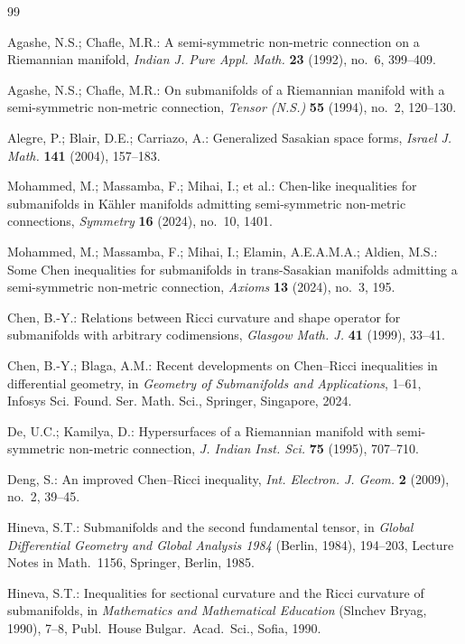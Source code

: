 \documentclass[11pt]{article}
\theoremstyle{definition}
\begin{document}
\begin{thebibliography}{99}

 Agashe, N.S.; Chafle, M.R.: A semi-symmetric non-metric connection on a Riemannian manifold, \emph{Indian J. Pure Appl. Math.} \textbf{23} (1992), no.\ 6, 399--409.

 Agashe, N.S.; Chafle, M.R.: On submanifolds of a Riemannian manifold with a semi-symmetric non-metric connection, \emph{Tensor (N.S.)} \textbf{55} (1994), no.\ 2, 120--130.

 Alegre, P.; Blair, D.E.; Carriazo, A.: Generalized Sasakian space forms, \emph{Israel J. Math.} \textbf{141} (2004), 157--183.

 Mohammed, M.; Massamba, F.; Mihai, I.; et al.: Chen-like inequalities for submanifolds in K\"ahler manifolds admitting semi-symmetric non-metric connections, \emph{Symmetry} \textbf{16} (2024), no.\ 10, 1401.

 Mohammed, M.; Massamba, F.; Mihai, I.; Elamin, A.E.A.M.A.; Aldien, M.S.: Some Chen inequalities for submanifolds in trans-Sasakian manifolds admitting a semi-symmetric non-metric connection, \emph{Axioms} \textbf{13} (2024), no.\ 3, 195.

 Chen, B.-Y.: Relations between Ricci curvature and shape operator for submanifolds with arbitrary codimensions, \emph{Glasgow Math. J.} \textbf{41} (1999), 33--41.

 Chen, B.-Y.; Blaga, A.M.: Recent developments on Chen--Ricci inequalities in differential geometry, in \emph{Geometry of Submanifolds and Applications}, 1--61, Infosys Sci. Found. Ser. Math. Sci., Springer, Singapore, 2024.

 De, U.C.; Kamilya, D.: Hypersurfaces of a Riemannian manifold with semi-symmetric non-metric connection, \emph{J. Indian Inst. Sci.} \textbf{75} (1995), 707--710.

 Deng, S.: An improved Chen--Ricci inequality, \emph{Int. Electron. J. Geom.} \textbf{2} (2009), no.\ 2, 39--45.

 Hineva, S.T.: Submanifolds and the second fundamental tensor, in \emph{Global Differential Geometry and Global Analysis 1984} (Berlin, 1984), 194--203, Lecture Notes in Math.\ 1156, Springer, Berlin, 1985.

 Hineva, S.T.: Inequalities for sectional curvature and the Ricci curvature of submanifolds, in \emph{Mathematics and Mathematical Education} (Slnchev Bryag, 1990), 7--8, Publ.\ House Bulgar.\ Acad.\ Sci., Sofia, 1990.


\end{thebibliography}
\end{document}

